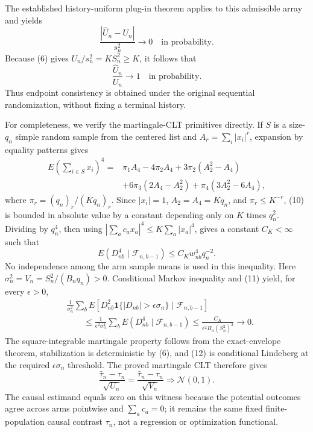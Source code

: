 The established history-uniform plug-in theorem applies to this admissible
array and yields
\[
\frac{|\widehat U_n-U_n|}{s_n^2}\longrightarrow0
\quad\text{in probability}.
\tag{8}
\]
Because (6) gives \(U_n/s_n^2=KS_n^2\ge K\), it follows that
\[
\frac{\widehat U_n}{U_n}\longrightarrow1
\quad\text{in probability}.
\tag{9}
\]
Thus endpoint consistency is obtained under the original sequential
randomization, without fixing a terminal history.

For completeness, we verify the martingale-CLT primitives directly.  If
\(S\) is a size-\(q_n\) simple random sample from the centered list and
\(A_r=\sum_i|x_i|^r\), expansion by equality patterns gives
\[
\begin{aligned}
E\left(\sum_{i\in S}x_i\right)^4
={}&\pi_1A_4-4\pi_2A_4+3\pi_2(A_2^2-A_4)\\
&+6\pi_3(2A_4-A_2^2)+\pi_4(3A_2^2-6A_4),
\end{aligned}
\tag{10}
\]
where \(\pi_r=(q_n)_r/(Kq_n)_r\).  Since \(|x_i|=1\),
\(A_2=A_4=Kq_n\), and \(\pi_r\le K^{-r}\), (10) is bounded in absolute
value by a constant depending only on \(K\) times \(q_n^2\).  Dividing by
\(q_n^4\), then using
\(|\sum_ac_ax_a|^4\le K\sum_a|x_a|^4\), gives a constant
\(C_K<\infty\) such that
\[
E(D_{nb}^4\mid\mathcal F_{n,b-1})
\le C_Kw_{nb}^4q_n^{-2}.
\tag{11}
\]
No independence among the arm sample means is used in this inequality.
Here \(\sigma_n^2=V_n=S_n^2/(B_nq_n)>0\).  Conditional Markov inequality
and (11) yield, for every \(\epsilon>0\),
\[
\begin{aligned}
&\frac1{\sigma_n^2}\sum_bE\!\left[D_{nb}^2
\mathbf1\{|D_{nb}|>\epsilon\sigma_n\}
\mid\mathcal F_{n,b-1}\right]\\
&\qquad\le\frac1{\epsilon^2\sigma_n^4}
\sum_bE(D_{nb}^4\mid\mathcal F_{n,b-1})
\le\frac{C_K}{\epsilon^2B_n(S_n^2)^2}\longrightarrow0.
\end{aligned}
\tag{12}
\]
The square-integrable martingale property follows from the exact-envelope
theorem, stabilization is deterministic by (6), and (12) is conditional
Lindeberg at the required \(\epsilon\sigma_n\) threshold.  The proved
martingale CLT therefore gives
\[
\frac{\widehat\tau_n-\tau_n}{\sqrt{U_n}}
=\frac{\widehat\tau_n-\tau_n}{\sqrt{V_n}}
\Rightarrow\mathcal N(0,1).
\tag{13}
\]
The causal estimand equals zero on this witness because the potential
outcomes agree across arms pointwise and \(\sum_ac_a=0\); it remains the
same fixed finite-population causal contrast \(\tau_n\), not a regression
or optimization functional.

